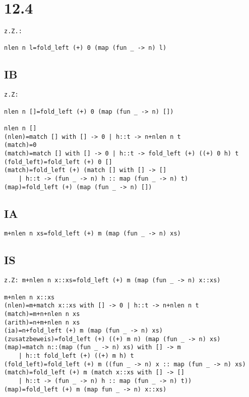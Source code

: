 \documentclass{article}
\begin{document}
\section*{12.4}

\begin{lstlisting}
z.Z.:

nlen n l=fold_left (+) 0 (map (fun _ -> n) l)
\end{lstlisting}

\subsection*{IB}

\begin{lstlisting}
z.Z:

nlen n []=fold_left (+) 0 (map (fun _ -> n) [])

nlen n []
(nlen)=match [] with [] -> 0 | h::t -> n+nlen n t
(match)=0
(match)=match [] with [] -> 0 | h::t -> fold_left (+) ((+) 0 h) t
(fold_left)=fold_left (+) 0 []
(match)=fold_left (+) (match [] with [] -> []
	| h::t -> (fun _ -> n) h :: map (fun _ -> n) t)
(map)=fold_left (+) (map (fun _ -> n) [])
\end{lstlisting}

\subsection*{IA}

\begin{lstlisting}
m+nlen n xs=fold_left (+) m (map (fun _ -> n) xs)
\end{lstlisting}

\subsection*{IS}

\begin{lstlisting}
z.Z: m+nlen n x::xs=fold_left (+) m (map (fun _ -> n) x::xs)

m+nlen n x::xs
(nlen)=m+match x::xs with [] -> 0 | h::t -> n+nlen n t
(match)=m+n+nlen n xs
(arith)=n+m+nlen n xs
(ia)=n+fold_left (+) m (map (fun _ -> n) xs)
(zusatzbeweis)=fold_left (+) ((+) m n) (map (fun _ -> n) xs)
(map)=match n::(map (fun _ -> n) xs) with [] -> m
	| h::t fold_left (+) ((+) m h) t
(fold_left)=fold_left (+) m ((fun _ -> n) x :: map (fun _ -> n) xs)
(match)=fold_left (+) m (match x::xs with [] -> []
	| h::t -> (fun _ -> n) h :: map (fun _ -> n) t))
(map)=fold_left (+) m (map fun _ -> n) x::xs)
\end{lstlisting}
\end{document}
